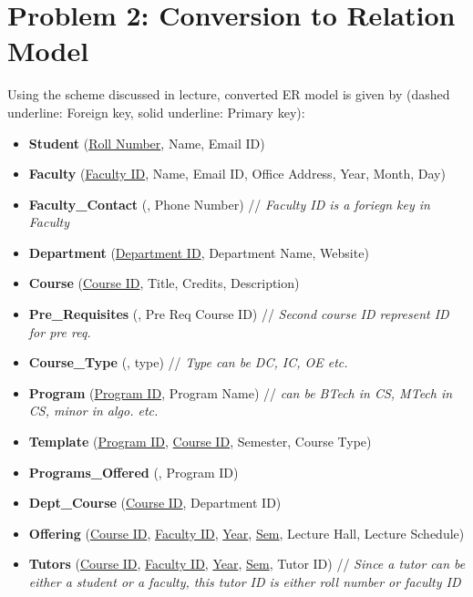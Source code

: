 \documentclass[a4paper]{article}
\begin{document}
\section*{Problem 2: Conversion to Relation Model}
Using the scheme discussed in lecture, converted ER model is given by (dashed underline: Foreign key, solid underline: Primary key):
\begin{itemize}
	\item \textbf{Student} (\underline{Roll Number}, Name, Email ID)

	\item \textbf{Faculty} (\underline{Faculty ID}, Name, Email ID, Office Address, Year, Month, Day)

	\item \textbf{Faculty\_Contact} (, Phone Number) // \textit{Faculty ID is a foriegn key in Faculty}

	\item \textbf{Department} (\underline{Department ID}, Department Name, Website)

	\item \textbf{Course} (\underline{Course ID}, Title, Credits, Description)

	\item \textbf{Pre\_Requisites} (, Pre Req Course ID) // \textit{Second course ID represent ID for pre req.}

	\item \textbf{Course\_Type} (, type) // \textit{Type can be DC, IC, OE etc.}

	\item \textbf{Program} (\underline{Program ID}, Program Name) // \textit{can be BTech in CS, MTech in CS, minor in algo. etc.}

	\item \textbf{Template} (\underline{Program ID}, \underline{Course ID}, Semester, Course Type)

	\item \textbf{Programs\_Offered} (, Program ID)

	\item \textbf{Dept\_Course} (\underline{Course ID}, Department ID)

	\item \textbf{Offering} (\underline{Course ID}, \underline{Faculty ID}, \underline{Year}, \underline{Sem}, Lecture Hall, Lecture Schedule)

	\item \textbf{Tutors} (\underline{Course ID}, \underline{Faculty ID}, \underline{Year}, \underline{Sem}, Tutor ID) // \textit{Since a tutor can be either a student or a faculty, this tutor ID is either roll number or faculty ID}


\end{itemize}
\end{document}
